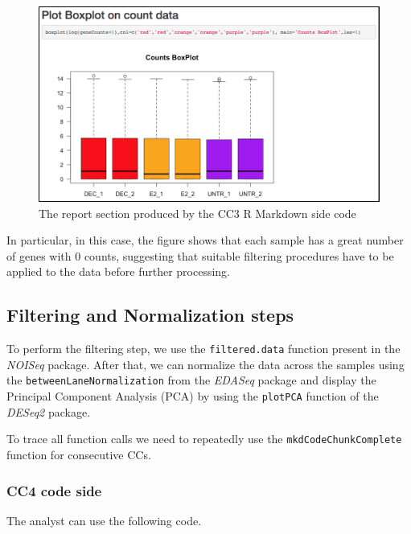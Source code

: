 \documentclass[]{article}
\begin{document}
\begin{figure}[ht]

{\centering \includegraphics[width=0.95\linewidth]{imgs/3} 

}

\caption{The report section produced by the CC3 R Markdown side code}\label{fig:unnamed-chunk-8}
\end{figure}

In particular, in this case, the figure shows that each sample has a
great number of genes with 0 counts, suggesting that suitable filtering
procedures have to be applied to the data before further processing.

\hypertarget{filtering-and-normalization-steps}{%
\subsection{Filtering and Normalization
steps}\label{filtering-and-normalization-steps}}

To perform the filtering step, we use the \texttt{filtered.data}
function present in the \emph{NOISeq} package. After that, we can
normalize the data across the samples using the
\texttt{betweenLaneNormalization} from the \emph{EDASeq} package and
display the Principal Component Analysis (PCA) by using the
\texttt{plotPCA} function of the \emph{DESeq2} package.

To trace all function calls we need to repeatedly use the
\texttt{mkdCodeChunkComplete} function for consecutive CCs.

\hypertarget{cc4-code-side}{%
\subsubsection{CC4 code side}\label{cc4-code-side}}

The analyst can use the following code.
\end{document}
